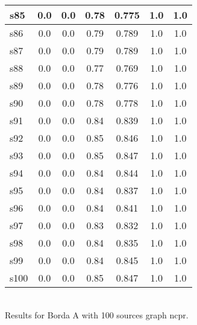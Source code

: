 \documentclass{article}
\begin{document}
\begin{tabular}{|l|c|c|c|c|c|c|}
\hline
s85 &0.0 & 0.0 & 0.78 & 0.775 & 1.0 & 1.0\\
\hline
s86 &0.0 & 0.0 & 0.79 & 0.789 & 1.0 & 1.0\\
\hline
s87 &0.0 & 0.0 & 0.79 & 0.789 & 1.0 & 1.0\\
\hline
s88 &0.0 & 0.0 & 0.77 & 0.769 & 1.0 & 1.0\\
\hline
s89 &0.0 & 0.0 & 0.78 & 0.776 & 1.0 & 1.0\\
\hline
s90 &0.0 & 0.0 & 0.78 & 0.778 & 1.0 & 1.0\\
\hline
s91 &0.0 & 0.0 & 0.84 & 0.839 & 1.0 & 1.0\\
\hline
s92 &0.0 & 0.0 & 0.85 & 0.846 & 1.0 & 1.0\\
\hline
s93 &0.0 & 0.0 & 0.85 & 0.847 & 1.0 & 1.0\\
\hline
s94 &0.0 & 0.0 & 0.84 & 0.844 & 1.0 & 1.0\\
\hline
s95 &0.0 & 0.0 & 0.84 & 0.837 & 1.0 & 1.0\\
\hline
s96 &0.0 & 0.0 & 0.84 & 0.841 & 1.0 & 1.0\\
\hline
s97 &0.0 & 0.0 & 0.83 & 0.832 & 1.0 & 1.0\\
\hline
s98 &0.0 & 0.0 & 0.84 & 0.835 & 1.0 & 1.0\\
\hline
s99 &0.0 & 0.0 & 0.84 & 0.845 & 1.0 & 1.0\\
\hline
s100 &0.0 & 0.0 & 0.85 & 0.847 & 1.0 & 1.0\\
\hline
\end{tabular}\\

\noindent Results for Borda A with 100 sources graph ncpr.
\end{document}
